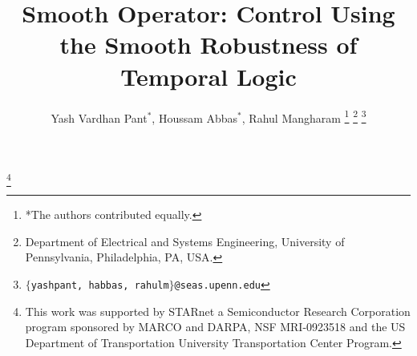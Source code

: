 \documentclass{ieeeconf}
\newcommand\blfootnote[1]{%
  \begingroup
  \renewcommand\thefootnote{}\footnote{#1}%
  \addtocounter{footnote}{-1}%
  \endgroup
}
\begin{document}


\title{Smooth Operator: Control Using the Smooth Robustness of Temporal Logic}


\author{Yash Vardhan Pant$^{*}$, Houssam Abbas$^{*}$, Rahul Mangharam%
\thanks{*The authors contributed equally.}%
\thanks{Department of Electrical and Systems Engineering, University of Pennsylvania, Philadelphia, PA, USA.}%
\thanks{{\tt\small $\{$yashpant, habbas, rahulm$\}$@seas.upenn.edu}}%
}






\maketitle
\blfootnote{This work was supported by STARnet a Semiconductor Research
Corporation program sponsored by MARCO and DARPA, NSF MRI-0923518 and the US Department of Transportation University Transportation Center Program.}





%


\end{document}
